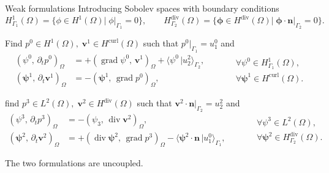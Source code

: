\documentclass[aspectratio=169]{beamer}
\DeclareMathOperator*{\grad}{grad}
\renewcommand{\div}{\operatorname{div}}
\DeclareMathOperator*{\curl}{curl}
\newcommand{\inpr}[3][]{\ensuremath{( #2, \, #3 )_{#1}}}
\newcommand{\dualpr}[3][]{\ensuremath{\langle #2 \, \vert #3 \rangle_{#1}}}
\begin{document}
\begin{frame}{Weak formulations}
Introducing Sobolev spaces with boundary conditions	
\begin{equation*}
		H^1_{\Gamma_1}(\Omega) = \{\phi \in H^1(\Omega) |\; \phi|_{\Gamma_1} = 0\}, \qquad
		H^{\div}_{\Gamma_2}(\Omega) = \{\bm{\phi} \in H^{\div}(\Omega) |\; \bm{\phi} \cdot \bm{n}|_{\Gamma_2} = 0\}.
\end{equation*}


\begin{tcolorbox}[nobeforeafter, colframe=theme,title=Primal weak formulation]%
Find $p^0 \in H^1(\Omega), \; \bm{v}^1 \in H^{\curl}(\Omega)$ such that $p^0|_{\Gamma_1} = u^0_1$ and
\begin{equation*}
	\begin{aligned}
		\inpr[\Omega]{\psi^0}{\partial_t p^0} &= +\inpr[\Omega]{\grad \psi^0}{\bm{v}^1} + \dualpr[\Gamma_2]{\psi^0}{u^2_2}, \\
		\inpr[\Omega]{\bm{\psi}^1}{\partial_t \bm{v}^1} &= -\inpr[\Omega]{\bm{\psi}^1}{\grad {p}^0},
	\end{aligned} \qquad
	\begin{aligned}
		&\forall \psi^0 \in H^1_{\Gamma_1}(\Omega), \\
		&\forall \bm{\psi}^1 \in H^{\curl}(\Omega).
	\end{aligned}
\end{equation*}
\end{tcolorbox} 

\begin{tcolorbox}[nobeforeafter, colframe=theme,title=Dual weak formulation]%
find $p^3 \in L^2(\Omega), \; \bm{v}^2 \in H^{\div}(\Omega)$ such that $\bm{v}^2 \cdot \bm{n}|_{\Gamma_2} = u^2_2$ and
\begin{equation*}
	\begin{aligned}
		\inpr[\Omega]{\psi^3}{\partial_t p^3} &= -\inpr[\Omega]{\psi_3}{\div\bm{v}^2}, \\
		\inpr[\Omega]{\bm{\psi}^2}{\partial_t \bm{v}^2} &= +\inpr[\Omega]{\div \bm{\psi}^2}{\grad {p}^3} - \dualpr[\Gamma_1]{\bm{\psi}^2 \cdot \bm{n}}{u^0_1},
	\end{aligned} \qquad
	\begin{aligned}
		&\forall \psi^3 \in L^2(\Omega), \\
		&\forall \bm{\psi}^2 \in H^{\div}_{\Gamma_2}(\Omega).
	\end{aligned}
\end{equation*}
\end{tcolorbox} 
The two formulations are uncoupled.
\end{frame}
\end{document}
